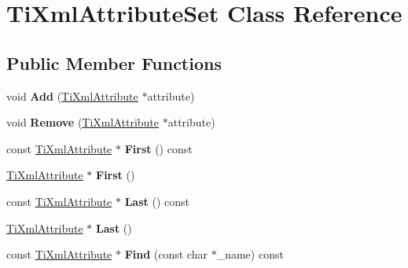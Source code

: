 \hypertarget{class_ti_xml_attribute_set}{
\section{TiXmlAttributeSet Class Reference}
\label{class_ti_xml_attribute_set}
}
\subsection*{Public Member Functions}
\begin{DoxyCompactItemize}
\item 
\hypertarget{class_ti_xml_attribute_set_a745e50ddaae3bee93e4589321e0b9c1a}{
void {\bfseries Add} (\hyperlink{class_ti_xml_attribute}{TiXmlAttribute} $\ast$attribute)}
\label{class_ti_xml_attribute_set_a745e50ddaae3bee93e4589321e0b9c1a}

\item 
\hypertarget{class_ti_xml_attribute_set_a924a73d071f2573f9060f0be57879c57}{
void {\bfseries Remove} (\hyperlink{class_ti_xml_attribute}{TiXmlAttribute} $\ast$attribute)}
\label{class_ti_xml_attribute_set_a924a73d071f2573f9060f0be57879c57}

\item 
\hypertarget{class_ti_xml_attribute_set_ae0636e88cedd4b09d61c451860f68598}{
const \hyperlink{class_ti_xml_attribute}{TiXmlAttribute} $\ast$ {\bfseries First} () const }
\label{class_ti_xml_attribute_set_ae0636e88cedd4b09d61c451860f68598}

\item 
\hypertarget{class_ti_xml_attribute_set_a99703bb08ca2aece2d7ef835de339ba0}{
\hyperlink{class_ti_xml_attribute}{TiXmlAttribute} $\ast$ {\bfseries First} ()}
\label{class_ti_xml_attribute_set_a99703bb08ca2aece2d7ef835de339ba0}

\item 
\hypertarget{class_ti_xml_attribute_set_a7b3f3ccf39a97bc25539d3fcc540296a}{
const \hyperlink{class_ti_xml_attribute}{TiXmlAttribute} $\ast$ {\bfseries Last} () const }
\label{class_ti_xml_attribute_set_a7b3f3ccf39a97bc25539d3fcc540296a}

\item 
\hypertarget{class_ti_xml_attribute_set_ab4c4edfb2d74f6ea31aae096743bd6e0}{
\hyperlink{class_ti_xml_attribute}{TiXmlAttribute} $\ast$ {\bfseries Last} ()}
\label{class_ti_xml_attribute_set_ab4c4edfb2d74f6ea31aae096743bd6e0}

\item 
\hypertarget{class_ti_xml_attribute_set_aec953170983df5b3d2b6da59c326e0b3}{
const \hyperlink{class_ti_xml_attribute}{TiXmlAttribute} $\ast$ {\bfseries Find} (const char $\ast$\_\-name) const }
\label{class_ti_xml_attribute_set_aec953170983df5b3d2b6da59c326e0b3}


\end{DoxyCompactItemize}
